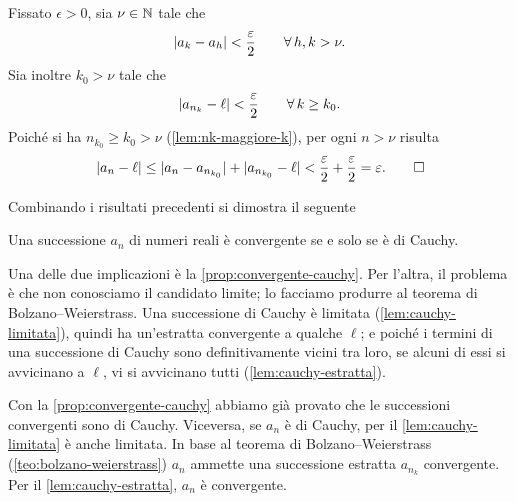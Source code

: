 \begin{dimostrazione}
Fissato $\epsilon>0$, sia $\nu\in\mathbb{N}$ tale che
\begin{equation}\label{eq:cauchy-estr-1}
  \lvert a_{k}-a_{h}\rvert<\frac{\varepsilon}2 \qquad\forall\, h,k>\nu .
\end{equation}
Sia inoltre $k_{0}>\nu$ tale che
\begin{equation}\label{eq:cauchy-estr-2}
  \lvert a_{n_{k}}-\ell\rvert<\frac{\varepsilon}2 \qquad\forall\, k\ge k_{0}.
\end{equation}
Poiché si ha $n_{k_{0}}\ge k_{0}>\nu$ (\cref{lem:nk-maggiore-k}), per ogni $n>\nu$ risulta
\begin{equation}\label{eq:cauchy-estr-3}
  \lvert a_{n}-\ell\rvert\le\lvert a_{n}-a_{n_{k_{0}}}\rvert+\lvert a_{n_{k_{0}}}-\ell\rvert<\frac{\varepsilon}2+\frac{\varepsilon}2=\varepsilon. \qedhere
\end{equation}
\end{dimostrazione}

Combinando i risultati precedenti si dimostra il seguente

\begin{teorema}\label{teo:criterio-cauchy}
Una successione $a_{n}$ di numeri reali è convergente se e solo se è di Cauchy.
\end{teorema}

\begin{schema}
\end{schema}

\begin{strategia}
Una delle due implicazioni è la \cref{prop:convergente-cauchy}. Per l'altra, il problema è
che non conosciamo il candidato limite; lo facciamo produrre al teorema di
Bolzano--Weierstrass. Una successione di Cauchy è limitata (\cref{lem:cauchy-limitata}),
quindi ha un'estratta convergente a qualche $\ell$; e poiché i termini di una successione
di Cauchy sono definitivamente vicini tra loro, se alcuni di essi si avvicinano a $\ell$,
vi si avvicinano tutti (\cref{lem:cauchy-estratta}).
\end{strategia}

\begin{dimostrazione}
Con la \cref{prop:convergente-cauchy} abbiamo già provato che le successioni convergenti
sono di Cauchy. Viceversa, se $a_{n}$ è di Cauchy, per il \cref{lem:cauchy-limitata} è
anche limitata. In base al teorema di Bolzano--Weierstrass (\cref{teo:bolzano-weierstrass})
$a_{n}$ ammette una successione estratta $a_{n_{k}}$ convergente. Per il
\cref{lem:cauchy-estratta}, $a_{n}$ è convergente.
\end{dimostrazione}

